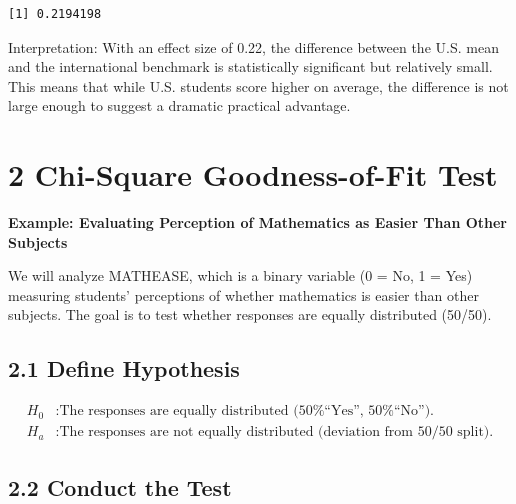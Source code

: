 \documentclass[
  letterpaper,
  DIV=11,
  numbers=noendperiod]{scrreprt}
\newenvironment{Shaded}{\begin{snugshade}}{\end{snugshade}}
\newcommand{\CommentTok}[1]{\textcolor[rgb]{0.37,0.37,0.37}{#1}}
\newcommand{\FunctionTok}[1]{\textcolor[rgb]{0.28,0.35,0.67}{#1}}
\newcommand{\NormalTok}[1]{\textcolor[rgb]{0.00,0.23,0.31}{#1}}
\newcommand{\OtherTok}[1]{\textcolor[rgb]{0.00,0.23,0.31}{#1}}
\newcommand{\SpecialCharTok}[1]{\textcolor[rgb]{0.37,0.37,0.37}{#1}}
\begin{document}
\begin{verbatim}
[1] 0.2194198
\end{verbatim}

Interpretation: With an effect size of 0.22, the difference between the
U.S. mean and the international benchmark is statistically significant
but relatively small. This means that while U.S. students score higher
on average, the difference is not large enough to suggest a dramatic
practical advantage.

\section*{2 Chi-Square Goodness-of-Fit
Test}\label{chi-square-goodness-of-fit-test-1}


\textbf{Example: Evaluating Perception of Mathematics as Easier Than
Other Subjects }

We will analyze MATHEASE, which is a binary variable (0 = No, 1 = Yes)
measuring students' perceptions of whether mathematics is easier than
other subjects. The goal is to test whether responses are equally
distributed (50/50).

\subsection*{2.1 Define Hypothesis}\label{define-hypothesis-1}

\[
\begin{aligned}
H_0 &: \text{The responses are equally distributed (50\% ``Yes'', 50\% ``No'').} \\
H_a &: \text{The responses are not equally distributed (deviation from 50/50 split).}
\end{aligned}
\]

\subsection*{2.2 Conduct the Test}\label{conduct-the-test-1}

\begin{Shaded}
\end{Shaded}
\end{document}
